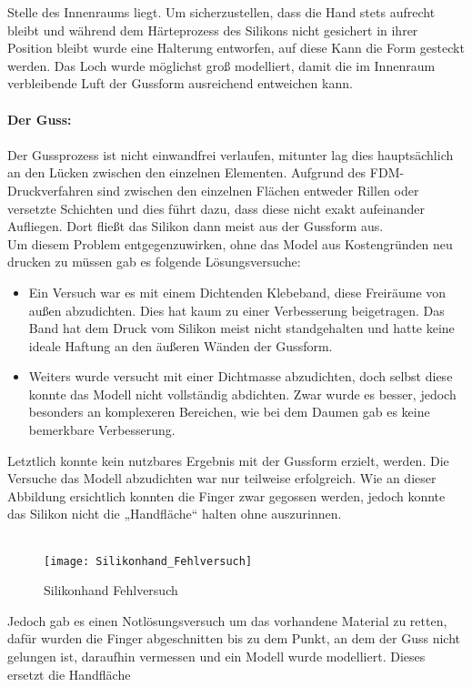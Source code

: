 \documentclass[titlepage,12pt,twoside]{article}
\begin{document}
Stelle des Innenraums liegt. Um sicherzustellen, dass die Hand stets aufrecht bleibt und während dem Härteprozess des Silikons nicht gesichert in ihrer Position bleibt wurde eine Halterung entworfen, auf diese Kann die Form gesteckt werden. Das Loch 
wurde möglichst groß modelliert, damit die im Innenraum verbleibende Luft der Gussform ausreichend entweichen kann. \\
\\
\textbf{Der Guss:} \\
\\
Der Gussprozess ist nicht einwandfrei verlaufen, mitunter lag dies hauptsächlich an den Lücken zwischen den einzelnen Elementen. Aufgrund des FDM-Druckverfahren sind zwischen den einzelnen Flächen entweder Rillen oder versetzte Schichten und dies 
führt dazu, dass diese nicht exakt aufeinander Aufliegen. Dort fließt das Silikon dann meist aus der Gussform aus. \\
Um diesem Problem entgegenzuwirken, ohne das Model aus Kostengründen neu drucken zu müssen gab es folgende Lösungsversuche:
\begin{itemize}
	\item Ein Versuch war es mit einem Dichtenden Klebeband, diese Freiräume von außen abzudichten. Dies hat kaum zu einer Verbesserung beigetragen. Das Band hat dem Druck vom Silikon meist nicht standgehalten und hatte keine ideale Haftung an 
	den äußeren Wänden der Gussform.
	\item Weiters wurde versucht mit einer Dichtmasse abzudichten, doch selbst diese konnte das Modell nicht vollständig abdichten. Zwar wurde es besser, jedoch besonders an komplexeren Bereichen, wie bei dem Daumen gab es keine bemerkbare Verbesserung.
\end{itemize}
\hfill \break
Letztlich konnte kein nutzbares Ergebnis mit der Gussform erzielt, werden. Die Versuche das Modell abzudichten war nur teilweise erfolgreich. Wie an dieser Abbildung ersichtlich konnten die Finger zwar gegossen werden, jedoch konnte das Silikon 
nicht die „Handfläche“ halten ohne auszurinnen. \\
\\
\begin{figure}[H]
	\begin{center}
		\scalebox{0.8}
		{\texttt{[image: Silikonhand\_Fehlversuch]}}
		\caption{Silikonhand Fehlversuch}
		\label{fig:Silikonhand_Fehlversuch}			
	\end{center}
\end{figure}
\hfill \break
Jedoch gab es einen Notlösungsversuch um das vorhandene Material zu retten, dafür wurden die Finger abgeschnitten bis zu dem Punkt, an dem der Guss nicht gelungen ist, daraufhin vermessen und ein Modell wurde modelliert. Dieses ersetzt die Handfläche 
\end{document}
